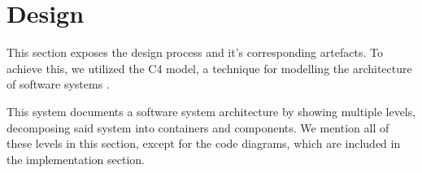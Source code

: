 
\section{Design}

This section exposes the design process and it's corresponding artefacts. To achieve this, we utilized the C4 model, a technique for modelling the architecture of software systems \parencite{Brown_2018}.

This system documents a software system architecture by showing multiple levels, decomposing said system into containers and components. We mention all of these levels in this section, except for the code diagrams, which are included in the implementation section.

